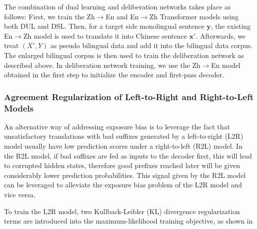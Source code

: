 \documentclass[a4paper]{article}
\begin{document}
\begin{CJK*}{UTF8}{gbsn}
The combination of dual learning and deliberation networks takes place as follows: First, we train the  Zh$\rightarrow$En and En$\rightarrow$Zh Transformer models using both DUL and DSL. Then, for a target side monolingual sentence $\mathbf{y}$, the existing En$\rightarrow$Zh model is used to translate it into Chinese sentence $\mathbf{x'}$. Afterwards, we treat $(X',Y)$ as pseudo bilingual data and add it into the bilingual data corpus. The enlarged bilingual corpus is then used to train the deliberation network as described above. In deliberation network training, we use the Zh$\rightarrow$En model obtained in the first step to initialize the encoder and first-pass decoder. 

\subsubsection{Agreement Regularization of Left-to-Right and Right-to-Left Models}
\label{sec-l2r-r2l}
An alternative way of addressing exposure bias is to leverage the fact that
unsatisfactory translations with bad suffixes generated by a left-to-right (L2R) model usually have low prediction scores under a right-to-left (R2L) model.
In the R2L model, if bad suffixes are fed as inputs to the decoder first, this will lead to corrupted hidden states, therefore good prefixes reached later will be given considerably lower prediction probabilities. This signal given by the R2L model can be leveraged to alleviate the exposure bias problem of the L2R model and vice versa.

To train the L2R model, two Kullback-Leibler (KL) divergence regularization terms are introduced into the maximum-likelihood training objective, as shown in





\end{CJK*}
\end{document}
